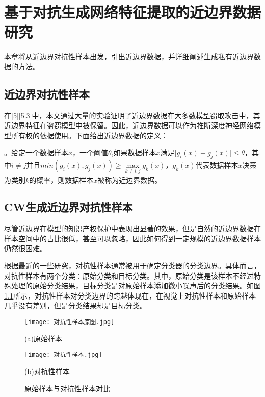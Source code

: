 
\chapter{基于对抗生成网络特征提取的近边界数据研究}\label{3}

本章将从近边界对抗性样本出发，引出近边界数据，并详细阐述生成私有近边界数据的方法。

\section{近边界对抗性样本}

在\ref{5}\ref{5.3}中，本文通过大量的实验证明了近边界数据在大多数模型窃取攻击中，其近边界特征在盗窃模型中被保留。因此，近边界数据可以作为推断深度神经网络模型所有权的依据使用。下面给出近边界数据的定义：

\begin{myDef}
	\label{def:1}
	。给定一个数据样本$x$，一个阈值$\theta$,如果数据样本$x$满足$\vert g_i(x) - g_j(x) \vert \leq \theta$，其中$i \neq j $并且$min(g_i(x), g_j(x)) \geq \mathop{max} \limits_{k \neq i, j}g_k(x)$，$g_k(x)$代表数据样本$x$决策为类别$k$的概率，则数据样本$x$被称为近边界数据。
\end{myDef}


\section{CW生成近边界对抗性样本}\label{3.2}

尽管近边界在模型的知识产权保护中表现出显著的效果，但是自然的近边界数据在样本空间中的占比很低，甚至可以忽略，因此如何得到一定规模的近边界数据样本仍然很困难。

根据最近的一些研究\cite{cao2021ipguard}，对抗性样本通常被用于确定分类器的分类边界。具体而言，对抗性样本有两个分类：原始分类和目标分类。其中，原始分类是该样本不经过特殊处理的原始分类结果，目标分类是对原始样本添加微小噪声后的分类结果。如图\ref{原始样本与对抗性样本对比}所示，对抗性样本对分类边界的跨越体现在，在视觉上对抗性样本和原始样本几乎没有差别，但是分类结果却是目标分类。

\begin{figure}[htbp]%
	\begin{minipage}[t]{0.5\linewidth}        %
		\hspace{2mm}
		\centering
		\texttt{[image: 对抗性样本原图.jpg]}
		\centerline{(a)原始样本}
	\end{minipage}
	\begin{minipage}[t]{0.5\linewidth}        %
		\hspace{2mm}
		\centering
		\texttt{[image: 对抗性样本.jpg]}
		\centerline{(b)对抗性样本}
	\end{minipage}
\setlength{\abovecaptionskip}{7mm} %
\caption{原始样本与对抗性样本对比}
\label{原始样本与对抗性样本对比}
\end {figure}

